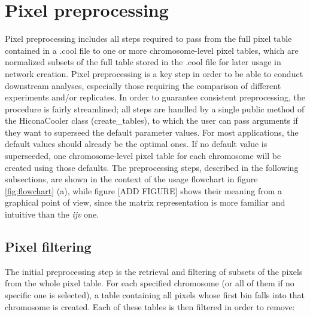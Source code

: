 \section{Pixel preprocessing}
Pixel preprocessing includes all steps required to pass from the full pixel table contained in a .cool file to one or more chromosome-level pixel tables, which are normalized subsets of the full table stored in the .cool file for later usage in network creation.  
Pixel preprocessing is a key step in order to be able to conduct downstream analyses, especially those requiring the comparison of different experiments and/or replicates. In order to guarantee consistent preprocessing, the procedure is fairly streamlined; all steps are handled by a single public method of the HiconaCooler class (create\_tables), to which the user can pass arguments if they want to superseed the default parameter values. For most applications, the default values should already be the optimal ones. If no default value is superseeded, one chromosome-level pixel table for each chromosome will be created using those defaults. The preprocessing steps, described in the following subsections, are shown in the context of the usage flowchart in figure \ref{fig:flowchart} (a), while figure [ADD FIGURE] shows their meaning from a graphical point of view, since the matrix representation is more familiar and intuitive than the \emph{ijv} one.

\subsection{Pixel filtering}


The initial preprocessing step is the retrieval and filtering of subsets of the pixels from the whole pixel table. For each specified chromosome (or all of them if no specific one is selected), a table containing all pixels whose first bin falls into that chromosome is created. Each of these tables is then filtered in order to remove:

